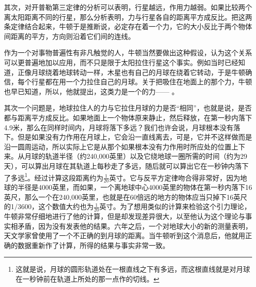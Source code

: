\documentclass[12pt,oneside]{book}
\begin{document}
\begin{common-format}
其次，对开普勒第三定律的分析可以表明，行星越远，作用力越弱。如果比较两个离太阳距离不同的行星，那么分析表明，力与行星各自的距离平方成反比。把这两条定律结合起来，牛顿于是推断说，必定存在着一个力，它的大小反比于两个物体间距离的平方，方向则沿着它们间的连线。

作为一个对事物普遍性有非凡触觉的人，牛顿当然要做出这种假设，认为这个关系可以更普遍地加以应用，而不只是限于太阳拉住行星这个事实。例如当时已经知道，正像月球绕着地球转动一样，木星也有自己的月球在绕着它转动，于是牛顿确信，每个行星都在用一个力拉住自己的月球。关于把吸住在地面上的那个力，牛顿也早已知道，所以，他就提出，这类力是一个的力—— 。

其次一个问题是，地球拉住人的力与它拉住月球的力是否“相同”，也就是说，是否都与距离平方成反比。如果地面上一个物体原来静止，然后释放，在第一秒内落下4.9米，那么在同样时间内，月球将落下多远？我们也许会说，月球根本没有落下。但是如果没有力作用在月球上，它会沿一直线离去，可是，它并不这样做而是沿一圆周运动，所以实际上它是从那个如果根本没有力作用时所应处的位置上下来。从月球的轨道半径（约240,000英里）以及它绕地球一圈所需的时间（约为29天），可以算出月球在其轨道上每秒走了多远，随后就可以算出它在一秒钟内落下了多远\footnote{这就是说，月球的圆形轨道处在一根直线之下有多远，而这根直线就是对月球在一秒钟前在轨道上所处的那一点作的切线。}。经过计算这段距离约为$\frac{1}{20}$英寸。它与反平方定律吻合得非常好，因为地球的半径是4000英里，而如果，一个离地球中心4000英里的物体在第一秒内落下16英尺，那么一个在240,000英里，也就是在60倍远的地方的物体应当只掉下16英尺的1/3600，这个数值大约也为$\frac{1}{20}$英寸。为了想用类似的计算来检验这个引力理论，牛顿非常仔细地进行了他的计算，但是却发现差异很大，以至他认为这个理论与事实相矛盾，因为没有发表他的结果。六年之后，一个对地球大小的新的测量表明，天文学家曾使用了一个不正确的到月球的距离。当牛顿听到这个消息后，他就用正确的数据重新作了计算，所得的结果与事实非常一致。


\end{common-format}
\end{document}
